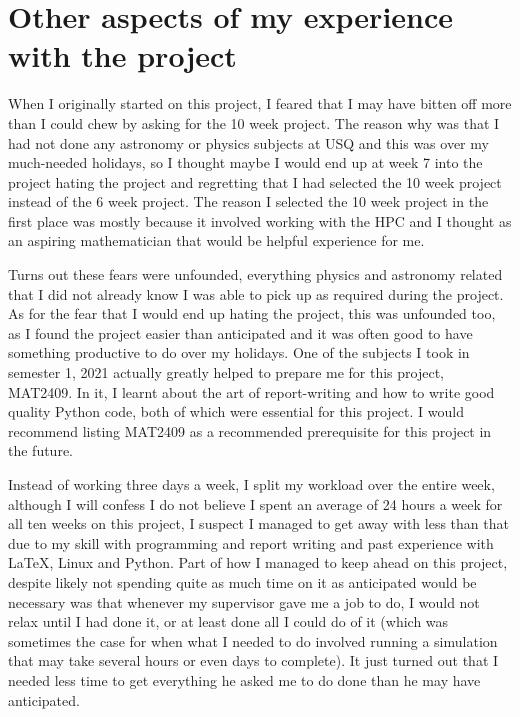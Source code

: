 \documentclass[12pt,a4paper,openright]{article}
\begin{document}
\section{Other aspects of my experience with the project}
When I originally started on this project, I feared that I may have bitten off more than I could chew by asking for the 10 week project. The reason why was that I had not done any astronomy or physics subjects at USQ and this was over my much-needed holidays, so I thought maybe I would end up at week 7 into the project hating the project and regretting that I had selected the 10 week project instead of the 6 week project. The reason I selected the 10 week project in the first place was mostly because it involved working with the HPC and I thought as an aspiring mathematician that would be helpful experience for me. 

Turns out these fears were unfounded, everything physics and astronomy related that I did not already know I was able to pick up as required during the project. As for the fear that I would end up hating the project, this was unfounded too, as I found the project easier than anticipated and it was often good to have something productive to do over my holidays. One of the subjects I took in semester 1, 2021 actually greatly helped to prepare me for this project, MAT2409. In it, I learnt about the art of report-writing and how to write good quality Python code, both of which were essential for this project. I would recommend listing MAT2409 as a recommended prerequisite for this project in the future. 

Instead of working three days a week, I split my workload over the entire week, although I will confess I do not believe I spent an average of 24 hours a week for all ten weeks on this project, I suspect I managed to get away with less than that due to my skill with programming and report writing and past experience with LaTeX, Linux and Python. Part of how I managed to keep ahead on this project, despite likely not spending quite as much time on it as anticipated would be necessary was that whenever my supervisor gave me a job to do, I would not relax until I had done it, or at least done all I could do of it (which was sometimes the case for when what I needed to do involved running a simulation that may take several hours or even days to complete). It just turned out that I needed less time to get everything he asked me to do done than he may have anticipated. 
\end{document}
